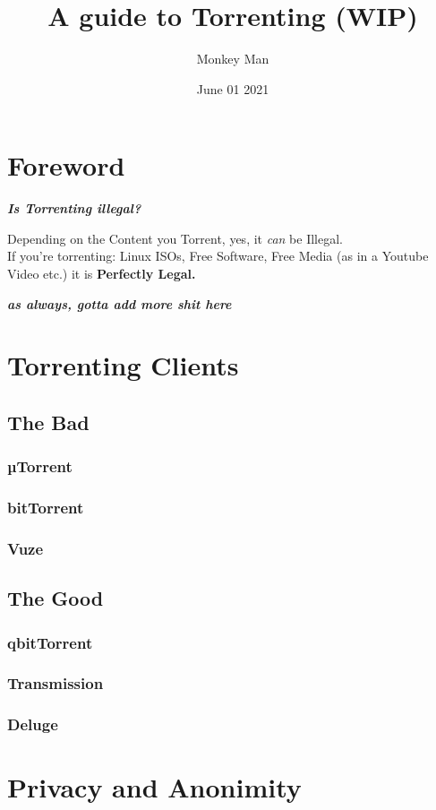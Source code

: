 \documentclass{article}
\author{Monkey Man}
\title{A guide to Torrenting (WIP)}
\date{June 01 2021}
\begin{document}
\maketitle
\tableofcontents

\section{Foreword}
	\textbf{\textit{Is Torrenting illegal?}}

	Depending on the Content you Torrent, yes, it \textit{can} be Illegal. \\
	If you're torrenting: Linux ISOs, Free Software, Free Media (as in a Youtube Video etc.) it is \textbf{Perfectly Legal.}
	
	\textbf{\textit{as always, gotta add more shit here}}
\section{Torrenting Clients}
	\subsection{The Bad}
		\subsubsection{µTorrent}
		\subsubsection{bitTorrent}
		\subsubsection{Vuze}
	\subsection{The Good}
		\subsubsection{qbitTorrent}
		\subsubsection{Transmission}
		\subsubsection{Deluge}
\section{Privacy and Anonimity}
\end{document}
